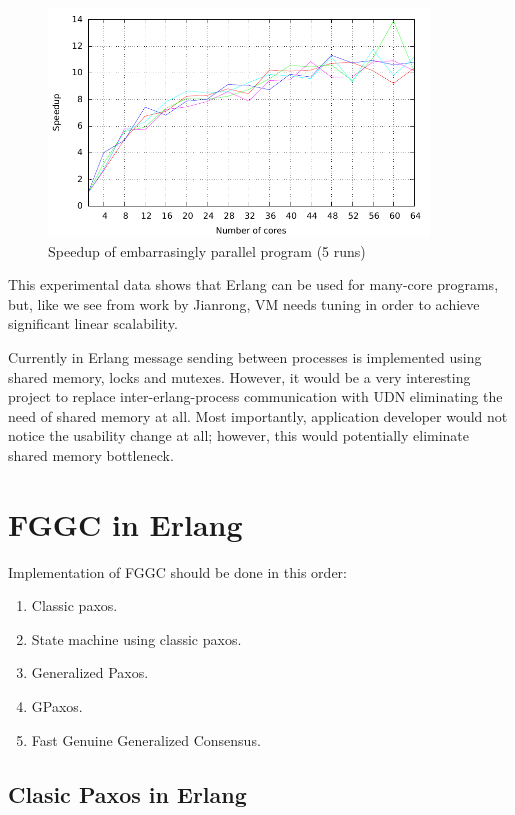 \documentclass[english,11pt]{article}
\newcommand{\fggc}{Fast Genuine Generalized Consensus}
\begin{document}
\begin{figure}
    \centering
    \includegraphics[width=0.9\textwidth]{parallel_speedup.pdf}
    \caption{Speedup of embarrasingly parallel program (5 runs)}
    \label{fig:parallel_speedup}
\end{figure}

This experimental data shows that Erlang can be used for many-core programs,
but, like we see from work by Jianrong\cite{erlang-manycore-scalability}, VM
needs tuning in order to achieve significant linear scalability.

Currently in Erlang message sending between processes is implemented using
shared memory, locks and mutexes. However, it would be a very interesting
project to replace inter-erlang-process communication with UDN eliminating the
need of shared memory at all. Most importantly, application developer would not
notice the usability change at all; however, this would potentially eliminate
shared memory bottleneck.

\section{FGGC in Erlang}
\label{sec:paxos-api}

Implementation of FGGC should be done in this order:

\begin{enumerate}
    \item Classic paxos.
    \item State machine using classic paxos.
    \item Generalized Paxos.
    \item GPaxos.
    \item \fggc.
\end{enumerate}

\subsection{Clasic Paxos in Erlang}
\end{document}
